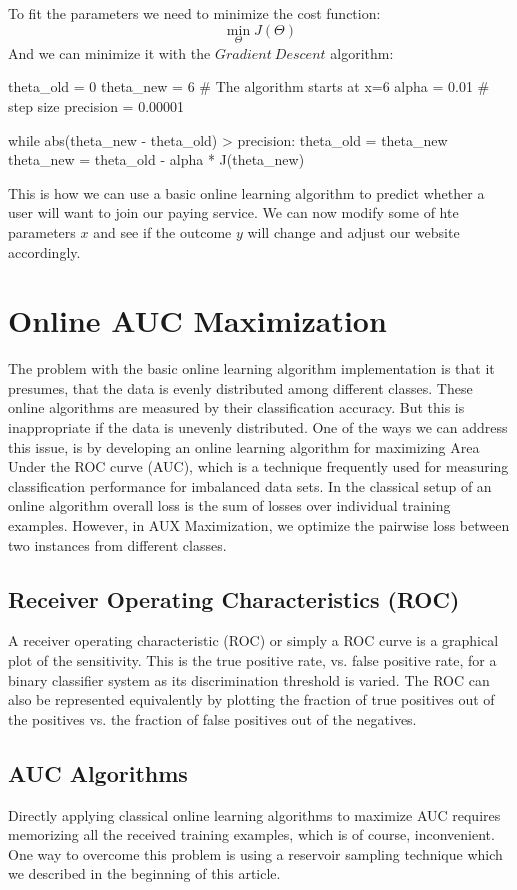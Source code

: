 \documentclass[journal]{IEEEtran/IEEEtran}
\begin{document}
To fit the parameters we need to minimize the cost function:
$$\displaystyle\min_\Theta J(\Theta)$$
And we can minimize it with the $Gradient\ Descent$ algorithm:
\begin{code}
theta_old = 0
theta_new = 6 # The algorithm starts at x=6
alpha = 0.01 # step size
precision = 0.00001

while abs(theta_new - theta_old) > precision:
  theta_old = theta_new
  theta_new = theta_old - alpha * J(theta_new)
\end{code}

This is how we can use a basic online learning algorithm to predict whether a user will want to join our paying service. We can now modify some of hte parameters $x$ and see if the outcome $y$ will change and adjust our website accordingly.
\section{Online AUC Maximization}
The problem with the basic online learning algorithm implementation is that it presumes, that the data is evenly distributed among different classes. These online algorithms are measured by their classification accuracy. But this is inappropriate if the data is unevenly distributed. One of the ways we can address this issue, is by developing an online learning algorithm for maximizing Area Under the ROC curve (AUC), which is a technique frequently used for measuring classification performance for imbalanced data sets. In the classical setup of an online algorithm overall loss is the sum of losses over individual training examples. However, in AUX Maximization, we optimize the pairwise loss between two instances from different classes. 
\subsection{Receiver Operating Characteristics (ROC)}
A receiver operating characteristic (ROC) or simply a ROC curve is a graphical plot of the sensitivity. This is the true positive rate, vs. false positive rate, for a binary classifier system as its discrimination threshold is varied. The ROC can also be represented equivalently by plotting the fraction of true positives out of the positives vs. the fraction of false positives out of the negatives. 
\subsection{AUC Algorithms}
Directly applying classical online learning algorithms to maximize AUC requires memorizing all the received training examples, which is of course, inconvenient. One way to overcome this problem is using a reservoir sampling technique which we described in the beginning of this article. \\
\end{document}
